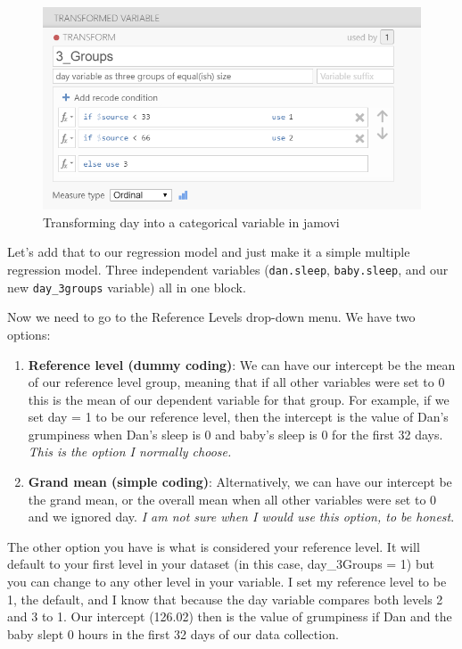 \documentclass[
]{book}
\providecommand{\tightlist}{%
  \setlength{\itemsep}{0pt}\setlength{\parskip}{0pt}}
\begin{document}
\begin{figure}

{\centering \includegraphics[width=1\linewidth]{images/13-regression/transform} 

}

\caption{Transforming day into a categorical variable in jamovi}\label{fig:unnamed-chunk-14}
\end{figure}

Let's add that to our regression model and just make it a simple multiple regression model. Three independent variables (\texttt{dan.sleep}, \texttt{baby.sleep}, and our new \texttt{day\_3groups} variable) all in one block.

Now we need to go to the Reference Levels drop-down menu. We have two options:

\begin{enumerate}
\def\labelenumi{\arabic{enumi}.}
\tightlist
\item
  \textbf{Reference level (dummy coding)}: We can have our intercept be the mean of our reference level group, meaning that if all other variables were set to 0 this is the mean of our dependent variable for that group. For example, if we set day = 1 to be our reference level, then the intercept is the value of Dan's grumpiness when Dan's sleep is 0 and baby's sleep is 0 for the first 32 days. \emph{This is the option I normally choose.}
\item
  \textbf{Grand mean (simple coding)}: Alternatively, we can have our intercept be the grand mean, or the overall mean when all other variables were set to 0 and we ignored day. \emph{I am not sure when I would use this option, to be honest}.
\end{enumerate}

The other option you have is what is considered your reference level. It will default to your first level in your dataset (in this case, day\_3Groups = 1) but you can change to any other level in your variable. I set my reference level to be 1, the default, and I know that because the day variable compares both levels 2 and 3 to 1. Our intercept (126.02) then is the value of grumpiness if Dan and the baby slept 0 hours in the first 32 days of our data collection.
\end{document}
